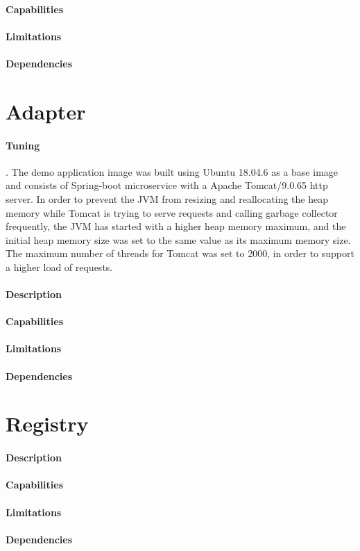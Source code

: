 \paragraph{Capabilities}
\paragraph{Limitations}
\paragraph{Dependencies}

\section{Adapter} %
\label{sec:adapter}

\paragraph{Tuning}. The demo application image was built using Ubuntu 18.04.6 as a base image and consists of Spring-boot microservice with a Apache Tomcat/9.0.65 http server.
In order to prevent the JVM from resizing and reallocating the heap memory while Tomcat is trying to serve requests and
calling garbage collector frequently, the JVM has started with a higher heap memory maximum, and the initial heap memory
size was set to the same value as its maximum memory size.
The maximum number of threads for Tomcat was set to 2000, in order to support a higher load of requests.

\paragraph{Description}
\paragraph{Capabilities}
\paragraph{Limitations}
\paragraph{Dependencies}

\section{Registry} %
\label{sec:registry}

\paragraph{Description}
\paragraph{Capabilities}
\paragraph{Limitations}
\paragraph{Dependencies}
